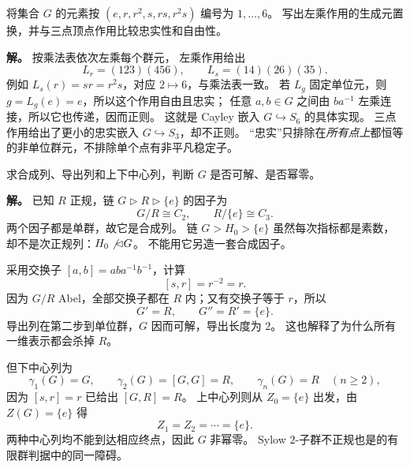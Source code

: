 \begin{workedexample}
\label{ex:d3-comprehensive-cayley}
将集合 $G$ 的元素按 $(e,r,r^2,s,rs,r^2s)$ 编号为 $1,\ldots,6$。
写出左乘作用的生成元置换，并与三点顶点作用比较忠实性和自由性。

\textbf{解。} 按乘法表依次左乘每个群元，
左乘作用给出
\[
L_r=(123)(456),\qquad L_s=(14)(26)(35).
\]
例如 $L_s(r)=sr=r^2s$，对应 $2\mapsto6$，与乘法表一致。
若 $L_g$ 固定单位元，则 $g=L_g(e)=e$，所以这个作用自由且忠实；
任意 $a,b\in G$ 之间由 $ba^{-1}$ 左乘连接，所以它也传递，因而正则。
这就是 Cayley 嵌入 $G\hookrightarrow S_6$ 的具体实现。
三点作用给出了更小的忠实嵌入 $G\hookrightarrow S_3$，却不正则。
“忠实”只排除在\emph{所有点上}都恒等的非单位群元，不排除单个点有非平凡稳定子。
\end{workedexample}

\begin{workedexample}
\label{ex:d3-comprehensive-series}
求合成列、导出列和上下中心列，判断 $G$ 是否可解、是否幂零。

\textbf{解。} 已知 $R$ 正规，链 $G\triangleright R\triangleright\{e\}$ 的因子为
\[
G/R\cong C_2,\qquad R/\{e\}\cong C_3.
\]
两个因子都是单群，故它是合成列。
链 $G>H_0>\{e\}$ 虽然每次指标都是素数，却不是次正规列：$H_0\not\lhd G$。
不能用它另造一套合成因子。

采用交换子 $[a,b]=aba^{-1}b^{-1}$，计算
\[
[s,r]=r^{-2}=r.
\]
因为 $G/R$ Abel，全部交换子都在 $R$ 内；又有交换子等于 $r$，所以
\[
G'=R,\qquad G''=R'=\{e\}.
\]
导出列在第二步到单位群，$G$ 因而可解，导出长度为 $2$。
这也解释了为什么所有一维表示都会杀掉 $R$。

但下中心列为
\[
\gamma_1(G)=G,\qquad\gamma_2(G)=[G,G]=R,
\qquad\gamma_n(G)=R\quad(n\ge2),
\]
因为 $[s,r]=r$ 已给出 $[G,R]=R$。
上中心列则从 $Z_0=\{e\}$ 出发，由 $Z(G)=\{e\}$ 得
\[
Z_1=Z_2=\cdots=\{e\}.
\]
两种中心列均不能到达相应终点，因此 $G$ 非幂零。
Sylow $2$-子群不正规也是的有限群判据中的同一障碍。
\end{workedexample}

